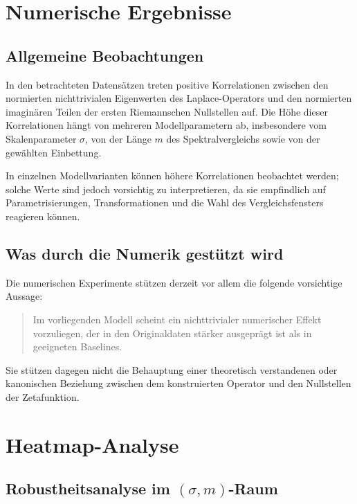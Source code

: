 \documentclass[11pt,a4paper,draft]{article}
\begin{document}
	\section{Numerische Ergebnisse}
	
	\subsection{Allgemeine Beobachtungen}
	
	In den betrachteten Datensätzen treten positive Korrelationen zwischen den normierten nichttrivialen Eigenwerten des Laplace-Operators und den normierten imaginären Teilen der ersten Riemannschen Nullstellen auf. Die Höhe dieser Korrelationen hängt von mehreren Modellparametern ab, insbesondere vom Skalenparameter \(\sigma\), von der Länge \(m\) des Spektralvergleichs sowie von der gewählten Einbettung.
	
	In einzelnen Modellvarianten können höhere Korrelationen beobachtet werden; solche Werte sind jedoch vorsichtig zu interpretieren, da sie empfindlich auf Parametrisierungen, Transformationen und die Wahl des Vergleichsfensters reagieren können.
	
	\subsection{Was durch die Numerik gestützt wird}
	
	Die numerischen Experimente stützen derzeit vor allem die folgende vorsichtige Aussage:
	\begin{quote}
		Im vorliegenden Modell scheint ein nichttrivialer numerischer Effekt vorzuliegen, der in den Originaldaten stärker ausgeprägt ist als in geeigneten Baselines.
	\end{quote}
	
	Sie stützen dagegen nicht die Behauptung einer theoretisch verstandenen oder kanonischen Beziehung zwischen dem konstruierten Operator und den Nullstellen der Zetafunktion.
	
	\section{Heatmap-Analyse}
	
	\subsection{Robustheitsanalyse im \((\sigma,m)\)-Raum}
	
\end{document}
